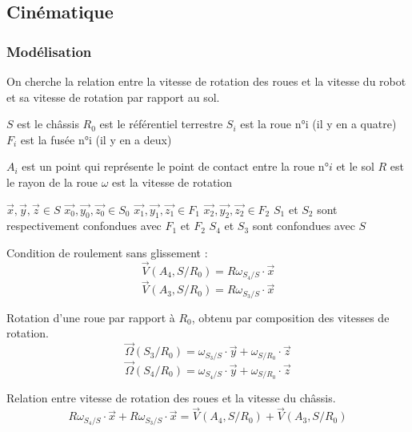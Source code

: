 \documentclass[a4paper,12pt]{report}  %
\begin{document}
\subsection{Cinématique} 
\subsubsection{Modélisation} 

On cherche la relation entre la vitesse de rotation des roues et la vitesse du robot et sa vitesse de rotation par rapport au sol. 


$S$ est le châssis 
$R_0$ est le référentiel terrestre 
$S_i$ est la roue n°i (il y en a quatre) 
$F_i$ est la fusée n°i (il y en a deux) 

$A_i$ est un point qui représente le point de contact entre la roue n°$i$ et le sol 
$R$ est le rayon de la roue 
$\omega$ est la vitesse de rotation 

$\vec{x},\vec{y},\vec{z} \in S$ 
$\vec{x_0},\vec{y_0},\vec{z_0} \in S_0$ 
$\vec{x_1},\vec{y_1},\vec{z_1} \in F_1$ 
$\vec{x_2},\vec{y_2},\vec{z_2} \in F_2$ 
$S_1$ et $S_2$ sont respectivement confondues avec $F_1$ et $F_2$ 
$S_4$ et $S_3$ sont confondues avec $S$ 

Condition de roulement sans glissement : 
\begin{equation}
	\vec{V}(A_4, S/R_0) = R\omega_{S_4/S} \cdot \vec{x} \tag{1}
\end{equation}
\begin{equation}
	\vec{V}(A_3, S/R_0)=R\omega_{S_3/S} \cdot \vec{x} \tag{2}
\end{equation}

Rotation d'une roue par rapport à $R_0$, obtenu par composition des vitesses de rotation. 
\begin{equation}
	\vec{\Omega}(S_3/R_0) = \omega_{S_3/S} \cdot \vec{y} + \omega_{S/R_0} \cdot \vec{z} \tag{3}
\end{equation}
\begin{equation}
	\vec{\Omega}(S_4/R_0) = \omega_{S_4/S} \cdot \vec{y} + \omega_{S/R_0} \cdot \vec{z} \tag{4}
\end{equation}

Relation entre vitesse de rotation des roues et la vitesse du châssis. 
\begin{equation}
	R\omega_{S_4/S} \cdot \vec{x} + R\omega_{S_3/S} \cdot \vec{x}
	=
	\vec{V}(A_4, S/R_0) + \vec{V}(A_3, S/R_0) 
	\tag{1)+(2}
\end{equation}
\end{document}
